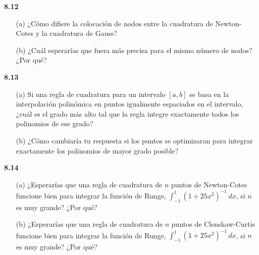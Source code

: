 \documentclass{article}
\begin{document}
\textbf{8.12}
\begin{itemize}
    \item[(a)] ¿Cómo difiere la colocación de nodos entre la cuadratura de Newton-Cotes y la cuadratura de Gauss?
    \item[(b)] ¿Cuál esperarías que fuera más precisa para el mismo número de nodos? ¿Por qué?
\end{itemize}

\textbf{8.13}
\begin{itemize}
    \item[(a)] Si una regla de cuadratura para un intervalo \([a, b]\) se basa en la interpolación polinómica en puntos igualmente espaciados en el intervalo, ¿cuál es el grado más alto tal que la regla integre exactamente todos los polinomios de ese grado?
    \item[(b)] ¿Cómo cambiaría tu respuesta si los puntos se optimizaran para integrar exactamente los polinomios de mayor grado posible?
\end{itemize}

\textbf{8.14}
\begin{itemize}
    \item[(a)] ¿Esperarías que una regla de cuadratura de \(n\) puntos de Newton-Cotes funcione bien para integrar la función de Runge, \(\int_{-1}^{1}(1 + 25x^2)^{-1} \, dx\), si \(n\) es muy grande? ¿Por qué?
    \item[(b)] ¿Esperarías que una regla de cuadratura de \(n\) puntos de Clenshaw-Curtis funcione bien para integrar la función de Runge, \(\int_{-1}^{1}(1 + 25x^2)^{-1} \, dx\), si \(n\) es muy grande? ¿Por qué?
\end{itemize}
\end{document}
